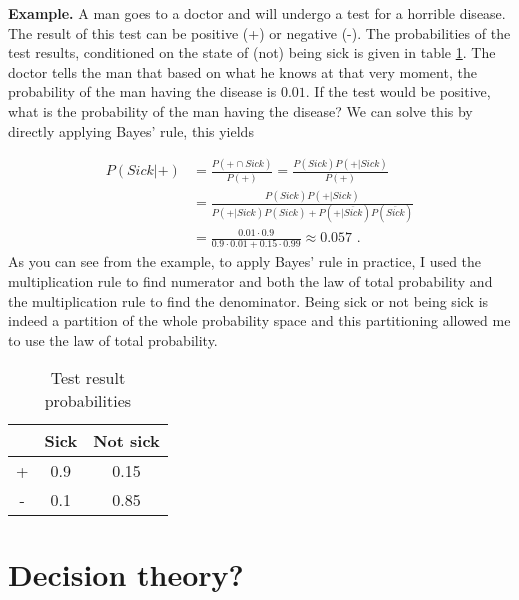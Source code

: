 \documentclass{report}
\theoremstyle{definition}
\begin{document}
	\textbf{Example. } A man goes to a doctor and will undergo a test for a horrible disease. The result of this test can be positive (+) or negative (-). The probabilities of the test results, conditioned on the state of (not) being sick is given in table \ref{tabel:examplebayes}. The doctor tells the man that based on what he knows at that very moment, the probability of the man having the disease is $0.01$. If the test would be positive, what is the probability of the man having the disease? We can solve this by directly applying Bayes' rule, this yields
	
	\begin{equation*}
		\begin{split}
		P(Sick|+)&=\frac{P(+\cap Sick)}{P(+)}=\frac{P(Sick)P(+|Sick)}{P(+)}\\
		&=\frac{P(Sick)P(+|Sick)}{P(+|Sick)P(Sick)+P(+|\overline{Sick})P(\overline{Sick})}\\
		&= \frac{0.01\cdot 0.9}{0.9\cdot0.01 + 0.15\cdot0.99}\approx0.057 \text{ .}
		\end{split}
	\end{equation*}
	As you can see from the example, to apply Bayes' rule in practice, I used the multiplication rule to find numerator and both the law of total probability and the multiplication rule to find the denominator. Being sick or not being sick is indeed a partition of the whole probability space and this partitioning allowed me to use the law of total probability.  
	
	\begin{table}
		\caption{Test result probabilities}
		\label{tabel:examplebayes}
		\begin{center}
		\begin{tabular}{ |c|c|c| } 
		 \hline
	 	   & Sick & Not sick \\ 
	 	 \hline
	 	+ & 0.9 & 0.15 \\ 
	 	- & 0.1 & 0.85 \\ 
	 	\hline
		\end{tabular}
		\end{center}
	\end{table} 
	
		\section{Decision theory?}
	
\end{document}
